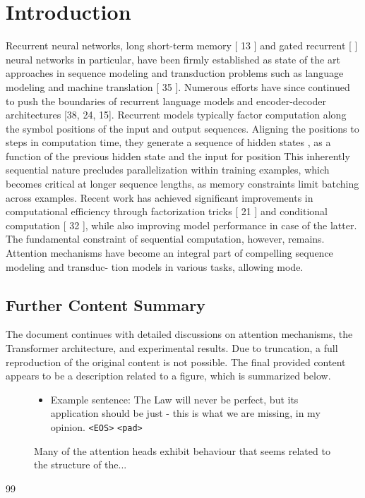 \documentclass[12pt, a4paper]{article}
\begin{document}
\section{Introduction}
Recurrent neural networks, long short-term memory [ 13 ] and gated recurrent [ ] neural networks in particular, have been firmly established as state of the art approaches in sequence modeling and transduction problems such as language modeling and machine translation [ 35 ]. Numerous efforts have since continued to push the boundaries of recurrent language models and encoder-decoder architectures [38, 24, 15]. Recurrent models typically factor computation along the symbol positions of the input and output sequences. Aligning the positions to steps in computation time, they generate a sequence of hidden states , as a function of the previous hidden state and the input for position This inherently sequential nature precludes parallelization within training examples, which becomes critical at longer sequence lengths, as memory constraints limit batching across examples. Recent work has achieved significant improvements in computational efficiency through factorization tricks [ 21 ] and conditional computation [ 32 ], while also improving model performance in case of the latter. The fundamental constraint of sequential computation, however, remains. Attention mechanisms have become an integral part of compelling sequence modeling and transduc- tion models in various tasks, allowing mode.

\subsection*{Further Content Summary}
The document continues with detailed discussions on attention mechanisms, the Transformer architecture, and experimental results. Due to truncation, a full reproduction of the original content is not possible. The final provided content appears to be a description related to a figure, which is summarized below.

\begin{figure}[H]
\centering
\caption{Many of the attention heads exhibit behaviour that seems related to the structure of the...}
\label{fig:attention_heads}
\begin{itemize}
    \item Example sentence: The Law will never be perfect, but its application should be just - this is what we are missing, in my opinion. \texttt{<EOS>} \texttt{<pad>}
\end{itemize}
\end{figure}

\begin{thebibliography}{99}
\end{thebibliography}
\end{document}
